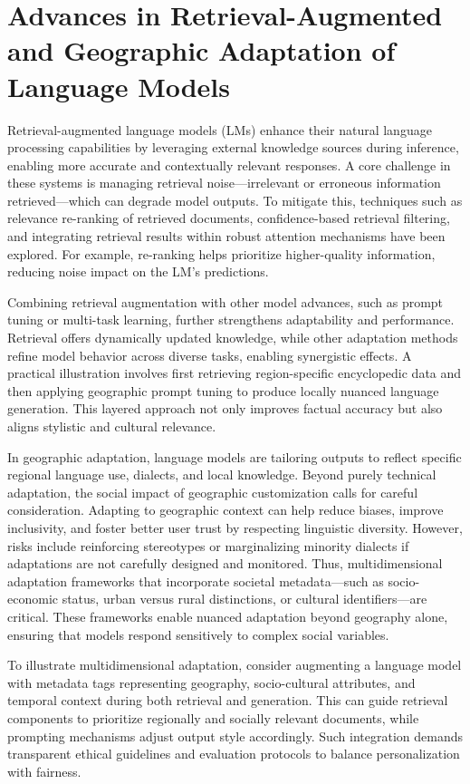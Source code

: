 \documentclass[sigconf]{acmart}
\begin{document}
\section{Advances in Retrieval-Augmented and Geographic Adaptation of Language Models}

Retrieval-augmented language models (LMs) enhance their natural language processing capabilities by leveraging external knowledge sources during inference, enabling more accurate and contextually relevant responses. A core challenge in these systems is managing retrieval noise—irrelevant or erroneous information retrieved—which can degrade model outputs. To mitigate this, techniques such as relevance re-ranking of retrieved documents, confidence-based retrieval filtering, and integrating retrieval results within robust attention mechanisms have been explored. For example, re-ranking helps prioritize higher-quality information, reducing noise impact on the LM's predictions.

Combining retrieval augmentation with other model advances, such as prompt tuning or multi-task learning, further strengthens adaptability and performance. Retrieval offers dynamically updated knowledge, while other adaptation methods refine model behavior across diverse tasks, enabling synergistic effects. A practical illustration involves first retrieving region-specific encyclopedic data and then applying geographic prompt tuning to produce locally nuanced language generation. This layered approach not only improves factual accuracy but also aligns stylistic and cultural relevance.

In geographic adaptation, language models are tailoring outputs to reflect specific regional language use, dialects, and local knowledge. Beyond purely technical adaptation, the social impact of geographic customization calls for careful consideration. Adapting to geographic context can help reduce biases, improve inclusivity, and foster better user trust by respecting linguistic diversity. However, risks include reinforcing stereotypes or marginalizing minority dialects if adaptations are not carefully designed and monitored. Thus, multidimensional adaptation frameworks that incorporate societal metadata—such as socio-economic status, urban versus rural distinctions, or cultural identifiers—are critical. These frameworks enable nuanced adaptation beyond geography alone, ensuring that models respond sensitively to complex social variables.

To illustrate multidimensional adaptation, consider augmenting a language model with metadata tags representing geography, socio-cultural attributes, and temporal context during both retrieval and generation. This can guide retrieval components to prioritize regionally and socially relevant documents, while prompting mechanisms adjust output style accordingly. Such integration demands transparent ethical guidelines and evaluation protocols to balance personalization with fairness.
\end{document}
